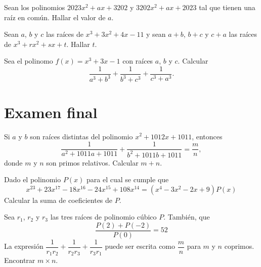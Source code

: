     \begin{section-problem}
        Sean los polinomios $2023x^2 + ax + 3202$ y $3202x^2 + ax + 2023$ tal que tienen una raíz en común.
        Hallar el valor de $a$.
    \end{section-problem}

    \begin{section-problem}
        Sean $a$, $b$ y $c$ las raíces de $x^3 + 3x^2 + 4x - 11$ y sean $a + b$, $b + c$ y $c + a$ las raíces de $x^3 + rx^2 + sx + t$.
        Hallar $t$.
    \end{section-problem}

    \begin{section-problem}
        Sea el polinomo $f(x) = x^3 + 3x - 1$ con raíces $a$, $b$ y $c$.
        Calcular
        \[\frac{1}{a^3 + b^3} + \frac{1}{b^3 + c^3} + \frac{1}{c^3 + a^3}.\]
    \end{section-problem}


\section{Examen final}

\begin{section-problem}
    Si $a$ y $b$ son raíces distintas del polinomio $x^2 + 1012x + 1011$, entonces
    \[\frac{1}{a^2 + 1011a + 1011} + \frac{1}{b^2 + 1011b + 1011} = \frac{m}{n},\]
    donde $m$ y $n$ son primos relativos.
    Calcular $m + n$.
\end{section-problem}

\begin{section-problem}
    Dado el polinomio $P(x)$ para el cual se cumple que
    \[x^{23} + 23x^{17} - 18x^{16} - 24x^{15} + 108x^{14} = (x^4 - 3x^2 - 2x + 9)P(x)\]
    Calcular la suma de coeficientes de $P$.
\end{section-problem}

\begin{section-problem}
    Sea $r_1$, $r_2$ y $r_3$ las tres raíces de polinomio cúbico $P$.
    También, que
    \[\frac{P(2) + P(-2)}{P(0)} = 52\]
    La expresión $\dfrac{1}{r_1 r_2} + \dfrac{1}{r_2 r_3} + \dfrac{1}{r_3 r_1}$ puede ser escrita como $\dfrac{m}{n}$ para $m$ y $n$ coprimos.
    Encontrar $m\times n$.
\end{section-problem}